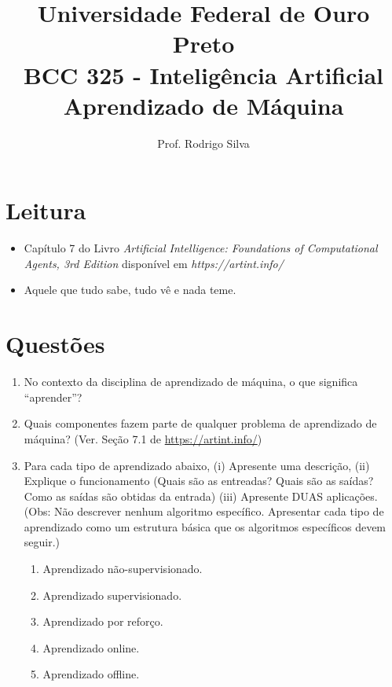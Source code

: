 \documentclass{article}
\title{\vspace{-2 cm}Universidade Federal de Ouro Preto \\ BCC 325 - Inteligência Artificial \\ Aprendizado de Máquina}
\author{Prof. Rodrigo Silva}
\date{}
\begin{document}
\maketitle

\section{Leitura}

\begin{itemize}
    \item Capítulo 7 do Livro\textit{ Artificial Intelligence: Foundations of Computational Agents,  3rd Edition} disponível em \textit{https://artint.info/}
    \item Aquele que tudo sabe, tudo vê e nada teme.
\end{itemize}

\section{Questões}

\begin{enumerate}
    \item No contexto da disciplina de aprendizado de máquina, o que significa ``aprender''?
    
    \item Quais componentes fazem parte de qualquer problema de aprendizado de máquina? (Ver. Seção 7.1 de \url{https://artint.info/})
    
    \item Para cada tipo de aprendizado abaixo, (i) Apresente uma descrição, (ii) Explique o funcionamento (Quais são as entreadas? Quais são as saídas? Como as saídas são obtidas da entrada) (iii) Apresente DUAS aplicações. (Obs: Não descrever nenhum algoritmo específico. Apresentar cada tipo de aprendizado como um estrutura básica que os algoritmos específicos devem seguir.)
    
    \begin{enumerate}
        \item Aprendizado não-supervisionado.
        \item Aprendizado supervisionado.
        \item Aprendizado por reforço.
        \item Aprendizado online.
        \item Aprendizado offline.
    \end{enumerate}
\end{enumerate}
\end{document}

